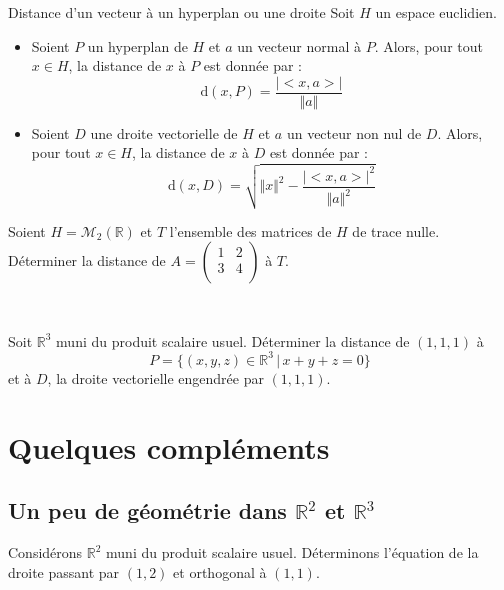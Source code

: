 \documentclass[french,11pt,twoside]{VcCours}
\begin{document}
\newpage

\begin{Proposition}{Distance d'un vecteur à un hyperplan ou une droite}
Soit $H$ un espace euclidien.
\begin{itemize}
\item Soient $P$ un hyperplan de $H$ et $a$ un vecteur normal à $P$. Alors, pour tout $x \in H$, la distance de $x$ à $P$ est donnée par :
$$ \textrm{d}(x,P) = \dfrac{\vert <x,a> \vert}{\Vert a \Vert}$$
\item Soient $D$ une droite vectorielle de $H$ et $a$ un vecteur non nul de $D$. Alors, pour tout $x \in H$, la distance de $x$ à $D$ est donnée par :
$$ \textrm{d}(x,D) = \sqrt{\Vert x \Vert^2 -  \dfrac{\vert <x,a> \vert^2}{\Vert a \Vert^2}} $$
\end{itemize}
\end{Proposition}

\begin{Demonstration}{}
\vspace{8.5cm}
\end{Demonstration}

\begin{Exemple}{} Soient $H = \mathcal{M}_2(\mathbb{R})$ et $T$ l'ensemble des matrices de $H$ de trace nulle. Déterminer la distance de $A = \begin{pmatrix}
1 & 2 \\
3 & 4 \\
\end{pmatrix}$ à $T$.

\end{Exemple}

\newpage

$\phantom{test}$

\vspace{2cm}


\begin{ApplicationDirecte}{} Soit $\mathbb{R}^3$ muni du produit scalaire usuel. Déterminer la distance de $(1,1,1)$ à 
$$P = \lbrace (x,y,z) \in \mathbb{R}^3 \, \vert \, x+y+z=0 \rbrace$$
 et à $D$, la droite vectorielle engendrée par $(1,1,1)$.
\end{ApplicationDirecte}

\section{Quelques compléments}
\subsection{Un peu de géométrie dans \texorpdfstring{$\mathbb{R}^2$ et $\mathbb{R}^3$}{ℝ² et ℝ³}}
\begin{Exemple}{} Considérons $\mathbb{R}^2$ muni du produit scalaire usuel. Déterminons l'équation de la droite passant par $(1,2)$ et orthogonal à $(1,1)$.

\vspace{3cm}
\end{Exemple}
\end{document}
